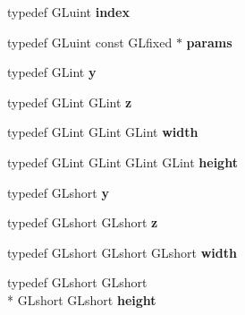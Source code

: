 \begin{DoxyCompactItemize}
\item 
\hypertarget{class_c_p_v_r_tgles_ext_a8c371b922a8940951930ac226e844106}{typedef G\+Luint {\bfseries index}}\label{class_c_p_v_r_tgles_ext_a8c371b922a8940951930ac226e844106}

\item 
\hypertarget{class_c_p_v_r_tgles_ext_a48d6cb0d5b002f158ef51aa7820eea2f}{typedef G\+Luint const G\+Lfixed $\ast$ {\bfseries params}}\label{class_c_p_v_r_tgles_ext_a48d6cb0d5b002f158ef51aa7820eea2f}

\item 
\hypertarget{class_c_p_v_r_tgles_ext_ac7bf98fc52ce75230aadf2465c0b2f1f}{typedef G\+Lint {\bfseries y}}\label{class_c_p_v_r_tgles_ext_ac7bf98fc52ce75230aadf2465c0b2f1f}

\item 
\hypertarget{class_c_p_v_r_tgles_ext_a8d75114c5ec9a9316943e78b7568064a}{typedef G\+Lint G\+Lint {\bfseries z}}\label{class_c_p_v_r_tgles_ext_a8d75114c5ec9a9316943e78b7568064a}

\item 
\hypertarget{class_c_p_v_r_tgles_ext_acfb10e2bb42a0eee3a4fadf15509b2db}{typedef G\+Lint G\+Lint G\+Lint {\bfseries width}}\label{class_c_p_v_r_tgles_ext_acfb10e2bb42a0eee3a4fadf15509b2db}

\item 
\hypertarget{class_c_p_v_r_tgles_ext_a6eea02f725f4de8ff5a84bcecfb52c47}{typedef G\+Lint G\+Lint G\+Lint G\+Lint {\bfseries height}}\label{class_c_p_v_r_tgles_ext_a6eea02f725f4de8ff5a84bcecfb52c47}

\item 
\hypertarget{class_c_p_v_r_tgles_ext_a3366f562194e9bb8e0435882728c0eac}{typedef G\+Lshort {\bfseries y}}\label{class_c_p_v_r_tgles_ext_a3366f562194e9bb8e0435882728c0eac}

\item 
\hypertarget{class_c_p_v_r_tgles_ext_a9042482b047c6be82bb3e89871fedd14}{typedef G\+Lshort G\+Lshort {\bfseries z}}\label{class_c_p_v_r_tgles_ext_a9042482b047c6be82bb3e89871fedd14}

\item 
\hypertarget{class_c_p_v_r_tgles_ext_aa02db350cb1d0a431fa96d1989fabf67}{typedef G\+Lshort G\+Lshort G\+Lshort {\bfseries width}}\label{class_c_p_v_r_tgles_ext_aa02db350cb1d0a431fa96d1989fabf67}

\item 
\hypertarget{class_c_p_v_r_tgles_ext_a6ea0116eb0f9f4a3c119a400dce1d4b7}{typedef G\+Lshort G\+Lshort \\*
G\+Lshort G\+Lshort {\bfseries height}}\label{class_c_p_v_r_tgles_ext_a6ea0116eb0f9f4a3c119a400dce1d4b7}


\end{DoxyCompactItemize}
